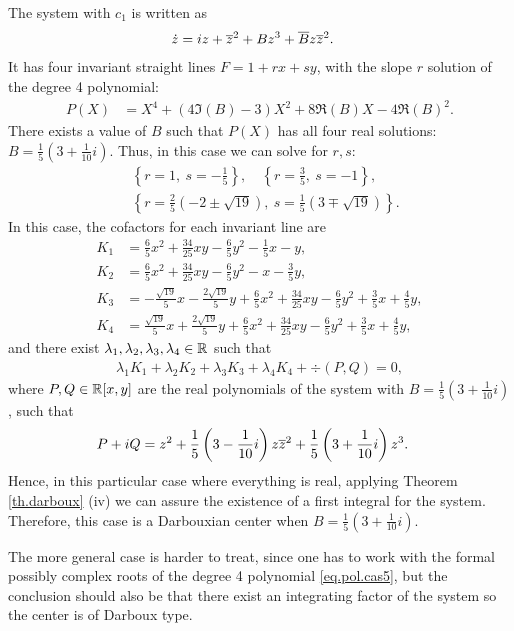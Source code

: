 The system with $c_1$ is written as
\begin{align}
\dot z &= iz+\overline{z}^2+Bz^3+\overline B z\overline{z}^2.
\end{align}
It has four invariant straight lines $F=1+rx+sy$, with the slope $r$ solution of the degree 4 polynomial:
\begin{align}
P(X)&=X^4+(4\Im(B)-3)X^2+8\Re(B)X-4\Re(B)^2.
\label{eq.pol.cas5}
\end{align}
There exists a value of $B$ such that $P(X)$ has all four real solutions: $B=\frac{1}{5}(3+\frac{1}{10}i)$. Thus, in this case we can solve for $r,s$:
\begin{align*}
&{}\left\{r=1,~s=-\frac{1}{5}\right\},\quad\left\{r=\frac{3}{5},~s=-1\right\},\\
&{}\left\{r=\frac{2}{5}(-2\pm\sqrt{19}),~s=\frac{1}{5}(3\mp\sqrt{19})\right\}.
\end{align*}
In this case, the cofactors for each invariant line are
\begin{align*}
K_1&=\frac{6}{5}x^2+\frac{34}{25}xy-\frac{6}{5}y^2-\frac{1}{5}x-y,\\
K_2&=\frac{6}{5}x^2+\frac{34}{25}xy-\frac{6}{5}y^2-x-\frac{3}{5}y,\\
K_3&=-\frac{\sqrt{19}}{5}x-\frac{2\sqrt{19}}{5}y+\frac{6}{5}x^2+\frac{34}{25}xy-\frac{6}{5}y^2+\frac{3}{5}x+\frac{4}{5}y,\\
K_4&=\frac{\sqrt{19}}{5}x+\frac{2\sqrt{19}}{5}y+\frac{6}{5}x^2+\frac{34}{25}xy-\frac{6}{5}y^2+\frac{3}{5}x+\frac{4}{5}y,
\end{align*}
and there exist $\lambda_1,\lambda_2,\lambda_3,\lambda_4\in\mathbb{R}$ such that
\begin{align*}
\lambda_1K_1+\lambda_2K_2+\lambda_3K_3+\lambda_4K_4+\div(P,Q)=0,
\end{align*}
where $P,Q\in\mathbb{R}[x,y]$ are the real polynomials of the system with $B=\frac{1}{5}(3+\frac{1}{10}i)$, such that
\begin{align*}
P+iQ&=z^2+\frac{1}{5}\left(3-\frac{1}{10}i\right)z\overline{z}^2+\frac{1}{5}\left(3+\frac{1}{10}i\right)z^3.
\end{align*}
Hence, in this particular case where everything is real, applying Theorem \ref{th.darboux} (iv) we can assure the existence of a first integral for the system. Therefore, this case is a Darbouxian center when $B=\frac{1}{5}(3+\frac{1}{10}i)$.

The more general case is harder to treat, since one has to work with the formal possibly complex roots of the degree 4 polynomial \eqref{eq.pol.cas5}, but the conclusion should also be that there exist an integrating factor of the system so the center is of Darboux type.


